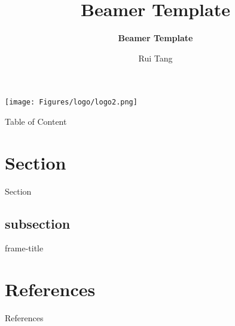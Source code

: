 \documentclass[xcolor={dvipsnames}, hyperref={colorlinks=true,linkcolor=Dandelion,urlcolor=magenta,citecolor=violet, hyperfootnotes=true}]{beamer}
\title{Beamer Template}
\subtitle{\textbf{Beamer Template}}
\institute[UMD]{University of Maryland, College Park}
\author{Rui Tang}
\begin{document}
\begin{frame}
    \titlepage
    \begin{center}
        \texttt{[image: Figures/logo/logo2.png]}
    \end{center}
\end{frame}

\begin{frame}{Table of Content}
    \tableofcontents
\end{frame}


\section{Section}
\begin{frame}{Section}

\end{frame}

\subsection{subsection}
\begin{frame}[allowframebreaks]{frame-title}


\end{frame}

\section{References}

\begin{frame}{References}
    \printbibliography
\end{frame}
\end{document}
